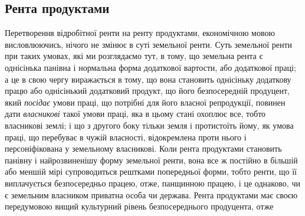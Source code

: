 \subsection{Рента продуктами}

Перетворення відробітної ренти на ренту продуктами, економічною мовою
висловлюючись, нічого не змінює в суті земельної ренти. Суть земельної ренти при
таких умовах, які ми розглядаємо тут, в тому, що земельна рента є однісінька
панівна і нормальна форма додаткової вартости, або додаткової праці; а це в
свою чергу виражається в тому, що вона становить однісіньку додаткову працю
або однісінький додатковий продукт, що його безпосередній продуцент, який
\emph{посідає} умови праці, що потрібні для його власної репродукції, повинен
дати \emph{власникові} такої умови праці, яка в цьому стані охоплює все, тобто
власникові землі; і що з другого боку тільки земля і протистоїть йому, як
умова праці, що перебуває в чужій власності, відокремлена проти нього і
персоніфікована у земельному власникові. Коли рента продуктами становить
панівну і найрозвиненішу форму земельної ренти, вона все ж постійно в більшій
або меншій мірі супроводиться рештками попередньої форми, тобто ренти, що
її виплачується безпосередньо працею, отже, панщинною працею, і це однаково,
чи є земельним власником приватна особа чи держава. Рента продуктами має
своєю передумовою вищий культурний рівень безпосереднього продуцента, отже
\parbreak{}  %
